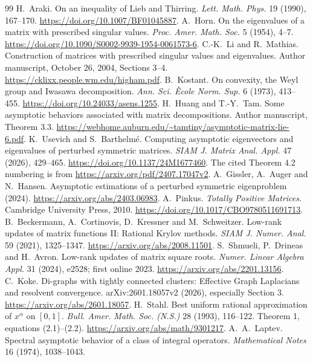 \begingroup
\raggedright
\begin{thebibliography}{99}
 H.~Araki. On an inequality of Lieb and Thirring.
\emph{Lett. Math. Phys.} 19 (1990), 167--170.
\url{https://doi.org/10.1007/BF01045887}.
 A.~Horn. On the eigenvalues of a matrix with prescribed
singular values. \emph{Proc. Amer. Math. Soc.} 5 (1954), 4--7.
\url{https://doi.org/10.1090/S0002-9939-1954-0061573-6}.
 C.-K.~Li and R.~Mathias. Construction of matrices
with prescribed singular values and eigenvalues. Author manuscript,
October 26, 2004, Sections 3--4.
\url{https://cklixx.people.wm.edu/higham.pdf}.
 B.~Kostant. On convexity, the Weyl group and Iwasawa
decomposition. \emph{Ann. Sci. \`Ecole Norm. Sup.} 6 (1973), 413--455.
\url{https://doi.org/10.24033/asens.1255}.
 H.~Huang and T.-Y.~Tam. Some asymptotic behaviors associated
with matrix decompositions. Author manuscript, Theorem 3.3.
\url{https://webhome.auburn.edu/~tamtiny/asymptotic-matrix-lie-6.pdf}.
 K.~Usevich and S.~Barthelm\'e. Computing asymptotic
eigenvectors and eigenvalues of perturbed symmetric matrices.
\emph{SIAM J. Matrix Anal. Appl.} 47 (2026), 429--465.
\url{https://doi.org/10.1137/24M1677460}.
The cited Theorem 4.2 numbering is from
\url{https://arxiv.org/pdf/2407.17047v2}.
 A.~Gissler, A.~Auger and N.~Hansen. Asymptotic estimations
of a perturbed symmetric eigenproblem (2024).
\url{https://arxiv.org/abs/2403.06983}.
 A.~Pinkus. \emph{Totally Positive Matrices}.
Cambridge University Press, 2010.
\url{https://doi.org/10.1017/CBO9780511691713}.
 B.~Beckermann, A.~Cortinovis, D.~Kressner and
M.~Schweitzer. Low-rank updates of matrix functions II: Rational Krylov
methods. \emph{SIAM J. Numer. Anal.} 59 (2021), 1325--1347.
\url{https://arxiv.org/abs/2008.11501}.
 S.~Shmueli, P.~Drineas and H.~Avron.
Low-rank updates of matrix square roots.
\emph{Numer. Linear Algebra Appl.} 31 (2024), e2528; first online 2023.
\url{https://arxiv.org/abs/2201.13156}.
 C.~Koke. Di-graphs with tightly connected clusters:
Effective Graph Laplacians and resolvent convergence.
arXiv:2601.18057v2 (2026), especially Section 3.
\url{https://arxiv.org/abs/2601.18057}.
 H.~Stahl. Best uniform rational approximation of
$x^\alpha$ on $[0,1]$. \emph{Bull. Amer. Math. Soc. (N.S.)}
28 (1993), 116--122. Theorem 1, equations (2.1)--(2.2).
\url{https://arxiv.org/abs/math/9301217}.
 A.~A.~Laptev. Spectral asymptotic behavior of a class
of integral operators. \emph{Mathematical Notes} 16 (1974), 1038--1043.

\end{thebibliography}
